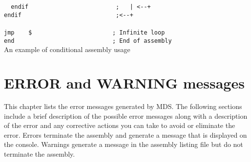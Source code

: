 \begin{code}[h!]
                        \verb'  '{\color{highlight_directive}\verb'endif'}\verb'                         '{\color{highlight_comment}\verb';   | <--+'}\\
                        {\color{highlight_directive}\verb'endif'}\verb'                           '{\color{highlight_comment}\verb';<--+'}\\
                        \verb''\\
                        {\color{highlight_instruction}\verb'jmp'}\verb'    '{\color{highlight_constant}\verb'$'}\verb'                       '{\color{highlight_comment}\verb'; Infinite loop'}\\
                        {\color{highlight_directive}\verb'end'}\verb'                            '{\color{highlight_comment}\verb'; End of assembly'}\\
                        \caption{An example of conditional assembly usage}
                \end{code}


                \clearpage
        \section{ERROR and WARNING messages}
        This chapter lists the error messages generated by MDS. The following sections
        include a brief description of the possible error messages along with a
        description of the error and any corrective actions you can take to avoid or
        eliminate the error. Errors terminate the assembly and generate a message that is displayed on
        the console. Warnings generate a message in the assembly listing file but do not terminate the assembly.
